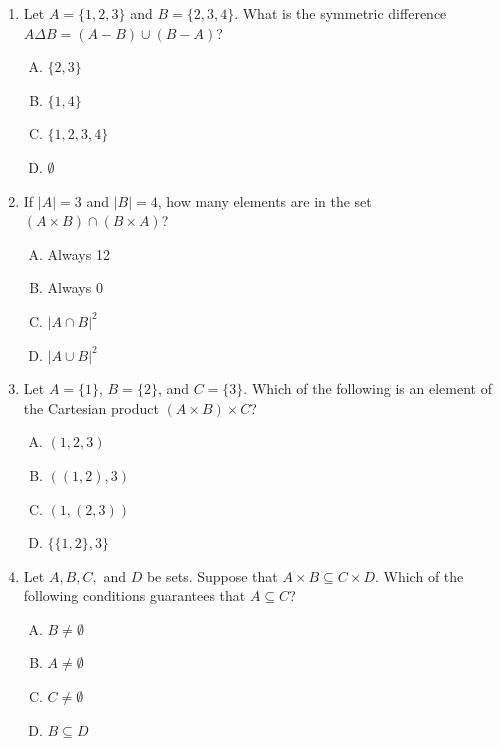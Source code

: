 \documentclass[12pt]{article}
\begin{document}
\begin{enumerate}[1.]
        \item{Let $A = \{1, 2, 3\}$ and $B = \{2, 3, 4\}$. What is the symmetric difference $A \Delta B = (A - B) \cup (B - A)$?}
            \begin{enumerate}[A.]
                \item{$\{2, 3\}$}
                \item{$\{1, 4\}$}
                \item{$\{1, 2, 3, 4\}$}
                \item{$\emptyset$}
            \end{enumerate}
            
        \item{If $|A| = 3$ and $|B| = 4$, how many elements are in the set $(A \times B) \cap (B \times A)$?}
            \begin{enumerate}[A.]
                \item{Always 12}
                \item{Always 0}
                \item{$|A \cap B|^2$}
                \item{$|A \cup B|^2$}
            \end{enumerate}
            
        \item{Let $A = \{1\}$, $B = \{2\}$, and $C = \{3\}$. Which of the following is an element of the Cartesian product $(A \times B) \times C$?}
            \begin{enumerate}[A.]
                \item{$(1, 2, 3)$}
                \item{$((1, 2), 3)$}
                \item{$(1, (2, 3))$}
                \item{$\{\{1, 2\}, 3\}$}
            \end{enumerate}
            
        \item{Let $A, B, C,$ and $D$ be sets. Suppose that $A \times B \subseteq C \times D$. Which of the following conditions guarantees that $A \subseteq C$?}
            \begin{enumerate}[A.]
                \item{$B \neq \emptyset$}
                \item{$A \neq \emptyset$}
                \item{$C \neq \emptyset$}
                \item{$B \subseteq D$}
            \end{enumerate}
            

\end{enumerate}
\end{document}
